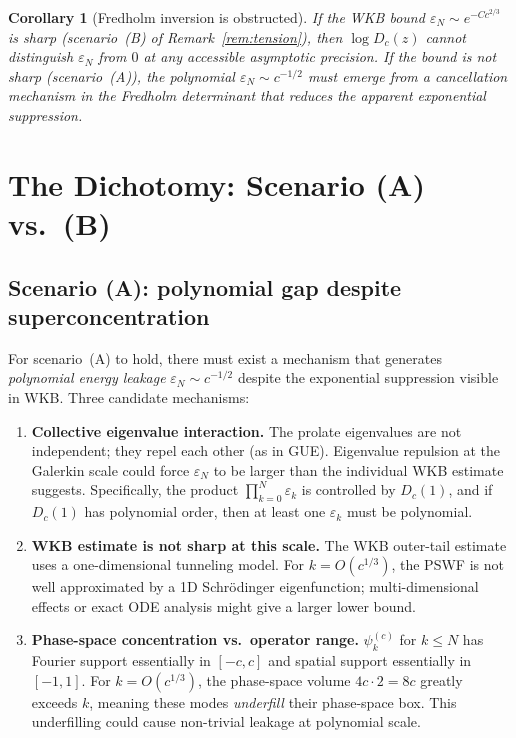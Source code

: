 \documentclass[12pt,a4paper]{article}
\newtheorem{corollary}[theorem]{Corollary}
\newcommand{\pswf}[1]{\psi_{#1}^{(c)}}
\newcommand{\Dc}{D_c}
\begin{document}
\begin{corollary}[Fredholm inversion is obstructed]
\label{cor:fredholm_obstructed}
If the WKB bound $\varepsilon_N \sim e^{-Cc^{2/3}}$
is sharp (scenario~(B) of Remark~\ref{rem:tension}),
then $\log \Dc(z)$ cannot distinguish
$\varepsilon_N$ from $0$ at any accessible
asymptotic precision.
If the bound is \emph{not} sharp (scenario~(A)),
the polynomial $\varepsilon_N \sim c^{-1/2}$ must
emerge from a \emph{cancellation mechanism}
in the Fredholm determinant that reduces the
apparent exponential suppression.
\end{corollary}

\section{The Dichotomy: Scenario (A) vs.\ (B)}
\label{sec:dichotomy}

\subsection{Scenario (A): polynomial gap despite superconcentration}

For scenario~(A) to hold, there must exist a mechanism
that generates \emph{polynomial energy leakage}
$\varepsilon_N \sim c^{-1/2}$ despite the exponential
suppression visible in WKB.
Three candidate mechanisms:

\begin{enumerate}
  \item \textbf{Collective eigenvalue interaction.}
        The prolate eigenvalues are not independent;
        they repel each other (as in GUE).
        Eigenvalue repulsion at the Galerkin scale
        could force $\varepsilon_N$ to be larger
        than the individual WKB estimate suggests.
        Specifically, the product
        $\prod_{k=0}^N \varepsilon_k$ is controlled
        by $\Dc(1)$, and if $\Dc(1)$ has polynomial
        order, then at least one $\varepsilon_k$ must
        be polynomial.

  \item \textbf{WKB estimate is not sharp at this scale.}
        The WKB outer-tail estimate uses a one-dimensional
        tunneling model.
        For $k = O(c^{1/3})$, the PSWF is
        not well approximated by a 1D Schr\"odinger
        eigenfunction; multi-dimensional effects
        or exact ODE analysis might give a
        larger lower bound.

  \item \textbf{Phase-space concentration vs.\ operator range.}
        $\pswf{k}$ for $k \leq N$ has Fourier support
        essentially in $[-c, c]$ and spatial support
        essentially in $[-1, 1]$.
        For $k = O(c^{1/3})$, the phase-space
        volume $4c \cdot 2 = 8c$ greatly exceeds $k$,
        meaning these modes \emph{underfill}
        their phase-space box.
        This underfilling could cause non-trivial
        leakage at polynomial scale.
\end{enumerate}
\end{document}
